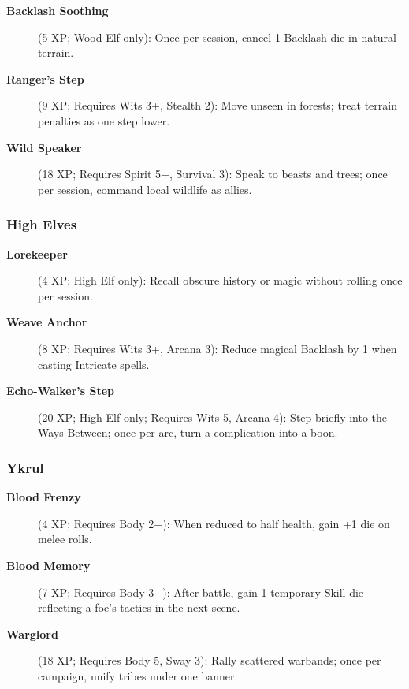 \begin{description}
\item[\textbf{Backlash Soothing}] (5 XP; Wood Elf only): Once per session, cancel 1 Backlash die in natural terrain.
\item[\textbf{Ranger's Step}] (9 XP; Requires Wits 3+, Stealth 2): Move unseen in forests; treat terrain penalties as one step lower.
\item[\textbf{Wild Speaker}] (18 XP; Requires Spirit 5+, Survival 3): Speak to beasts and trees; once per session, command local wildlife as allies.
\end{description}

\subsubsection{High Elves}
\label{subsubsec:high-elf-talents}

\begin{description}
\item[\textbf{Lorekeeper}] (4 XP; High Elf only): Recall obscure history or magic without rolling once per session.
\item[\textbf{Weave Anchor}] (8 XP; Requires Wits 3+, Arcana 3): Reduce magical Backlash by 1 when casting Intricate spells.
\item[\textbf{Echo-Walker's Step}] (20 XP; High Elf only; Requires Wits 5, Arcana 4): Step briefly into the Ways Between; once per arc, turn a complication into a boon.
\end{description}

\subsubsection{Ykrul}
\label{subsubsec:ykrul-talents}

\begin{description}
\item[\textbf{Blood Frenzy}] (4 XP; Requires Body 2+): When reduced to half health, gain +1 die on melee rolls.
\item[\textbf{Blood Memory}] (7 XP; Requires Body 3+): After battle, gain 1 temporary Skill die reflecting a foe's tactics in the next scene.
\item[\textbf{Warglord}] (18 XP; Requires Body 5, Sway 3): Rally scattered warbands; once per campaign, unify tribes under one banner.
\end{description}

